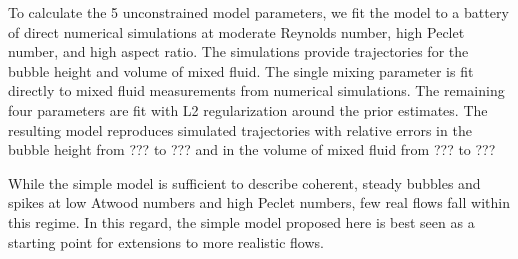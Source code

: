 To calculate the 5 unconstrained model parameters, we fit the model to a battery of direct numerical simulations at moderate Reynolds number, high Peclet number, and high aspect ratio.
The simulations provide trajectories for the bubble height and volume of mixed fluid.
The single mixing parameter is fit directly to mixed fluid measurements from numerical simulations.
The remaining four parameters are fit with L2 regularization around the prior estimates.
The resulting model reproduces simulated trajectories with relative errors in the bubble height from ??? to ??? and in the volume of mixed fluid from ??? to ???





While the simple model is sufficient to describe coherent, steady bubbles and spikes at low Atwood numbers and high Peclet numbers, few real flows fall within this regime.
In this regard, the simple model proposed here is best seen as a starting point for extensions to more realistic flows.
